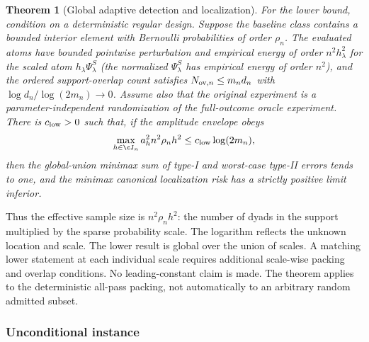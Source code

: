 \documentclass[11pt]{article}
\newtheorem{theorem}{Theorem}[section]
\theoremstyle{definition}
\newcommand{\1}{\mathbf 1}\newcommand{\op}{\operatorname}
\begin{document}
\begin{theorem}[Global adaptive detection and localization]
For the lower bound, condition on a deterministic regular design.  Suppose the
baseline class contains a bounded interior element with Bernoulli probabilities of
order $\rho_n$.  The evaluated atoms have bounded pointwise perturbation and empirical
energy of order $n^2h_\lambda^2$ for the scaled atom $h_\lambda\Psi^S_\lambda$
(the normalized $\Psi^S_\lambda$ has empirical energy of order $n^2$), and the
ordered support-overlap count satisfies
$N_{{\rm ov},n}\le m_nd_n$ with
$\log d_n/\log(2m_n)\to0$.  Assume also that the original experiment is a
parameter-independent randomization of the full-outcome oracle experiment.  There is
$c_{\rm low}>0$ such that, if the amplitude envelope obeys
\begin{equation}
 \max_{h\in\cJ_n}a_h^2n^2\rho_n h^2
 \le c_{\rm low}\log(2m_n),                                    \label{eq:lowerboundary}
\end{equation}
then the global-union minimax sum of type-I and worst-case type-II errors tends to
one, and the minimax canonical localization risk has a strictly positive limit
inferior.
\end{theorem}

Thus the effective sample size is $n^2\rho_nh^2$: the number of dyads in
the support multiplied by the sparse probability scale.  The logarithm reflects the
unknown location and scale.  The lower result is global over the union of scales.  A
matching lower statement at each individual scale requires additional scale-wise
packing and overlap conditions.  No leading-constant claim is made.  The theorem
applies to the deterministic all-pass packing, not automatically to an arbitrary
random admitted subset.

\subsubsection{Unconditional instance}
\end{document}
